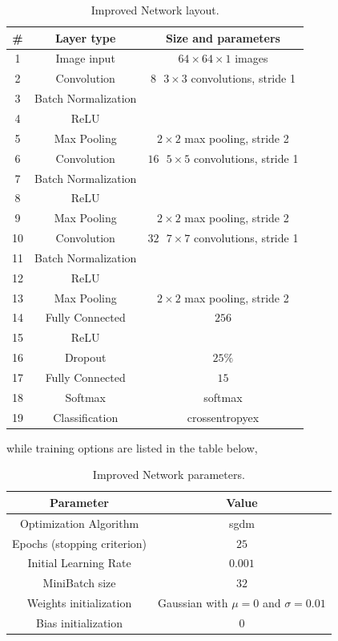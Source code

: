 \documentclass[a4paper, 11pt]{article} %
\begin{document}
\begin{table}[ht]
\centering
\begin{tabular}{|c|c|c|}
\hline 
\textbf{\#} & \textbf{Layer type} & \textbf{Size and parameters} \\
\hline \hline 
1 & Image input & $64 \times 64 \times 1$ images \\
\hline 
2 & Convolution & $8 \mbox{ } 3 \times 3$ convolutions, stride 1 \\
\hline 
3 & Batch Normalization & \\
\hline
4 & ReLU &  \\
\hline 
5 & Max Pooling & $2 \times 2$ max pooling, stride 2 \\
\hline
6 & Convolution & $16 \mbox{ } 5 \times 5$ convolutions, stride 1 \\
\hline 
7 & Batch Normalization & \\
\hline
8 & ReLU &  \\
\hline 
9 & Max Pooling & $2 \times 2$ max pooling, stride 2 \\
\hline
10 & Convolution & $32 \mbox{ } 7 \times 7$ convolutions, stride 1 \\
\hline 
11 & Batch Normalization & \\
\hline
12 & ReLU & \\
\hline 
13 & Max Pooling & $2 \times 2$ max pooling, stride 2 \\
\hline
14 & Fully Connected & $256$ \\
\hline
15 & ReLU & \\
\hline
16 & Dropout & $25\%$ \\
\hline
17 & Fully Connected & $15$ \\
\hline
18 & Softmax & softmax \\
\hline
19 & Classification & crossentropyex \\
\hline
\end{tabular}
\caption{Improved Network layout.}\label{tab:improved-network-layout}
\end{table}
\bigskip

while training options are listed in the table below,

\bigskip
\begin{table}[ht]
\centering
\begin{tabular}{|c|c|}
\hline 
\textbf{Parameter} & \textbf{Value} \\
\hline \hline 
Optimization Algorithm & sgdm \\
\hline 
Epochs (stopping criterion) & $25$\\
\hline 
Initial Learning Rate & $0.001$\\
\hline
MiniBatch size & $32$ \\
\hline
Weights initialization & Gaussian with $\mu = 0$ and $\sigma = 0.01$\\
\hline 
Bias initialization & $0$\\
\hline
\end{tabular}
\caption{Improved Network parameters.}\label{tab:improved-network-parameters}
\end{table}
\bigskip
\end{document}
